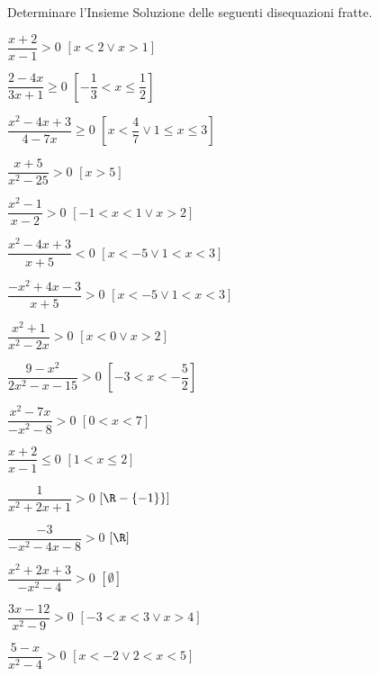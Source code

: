 
\begin{esercizio}[\Ast]
 \label{ese:4.58}
Determinare l'Insieme Soluzione delle seguenti disequazioni fratte.
\begin{multicols}{2}
\begin{enumeratea}
\item \(\dfrac{x+2}{x-1}>0\) \hfill \(\left[x<2\vee x>1\right]\)
\item \(\dfrac{2-4x}{3x+1}\ge 0\) \hfill \(\left[-\dfrac 1 3<x\le \dfrac 1 
2\right]\)
\item \(\dfrac{x^2-4x+3}{4-7x}\ge 0\) 
 \hfill \(\left[x<\dfrac 4 7\vee 1\le x\le 3\right]\)
\item \(\dfrac{x+5}{x^2-25}>0\) \hfill \(\left[x>5\right]\)
\item \(\dfrac{x^2-1}{x-2}>0\) \hfill \(\left[-1<x<1\vee x>2\right]\)
\item \(\dfrac{x^2-4x+3}{x+5}<0\) \hfill \(\left[x<-5\vee 1<x<3\right]\)
\item \(\dfrac{-x^2+4x-3}{x+5}>0\) \hfill \(\left[x<-5\vee 1<x<3\right]\)
\item \(\dfrac{x^2+1}{x^2-2x}>0\) \hfill \(\left[x<0\vee x>2\right]\)
\item \(\dfrac{9-x^2}{2x^2-x-15}>0\) \hfill \(\left[-3<x<-\dfrac 5 2\right]\)
\item \(\dfrac{x^2-7x}{-x^2-8}>0\) \hfill \(\left[0<x<7\right]\)
\item \(\dfrac{x+2}{x-1}\le 0\) \hfill \(\left[1< x\le 2\right]\)
\item \(\dfrac 1{x^2+2x+1}>0\) \hfill \(\left[\R-\{-1\}\}\right]\)
\item \(\dfrac{-3}{-x^2-4x-8}>0\) \hfill \(\left[\R\right]\)
\item \(\dfrac{x^2+2x+3}{-x^2-4}>0\) \hfill \(\left[\emptyset\right]\)
\item \(\dfrac{3x-12}{x^2-9}>0\) \hfill \(\left[-3<x<3\vee x>4\right]\)
\item \(\dfrac{5-x}{x^2-4}>0\) \hfill \(\left[x<-2\vee 2<x<5\right]\)
\end{enumeratea}
\end{multicols}
\end{esercizio}

